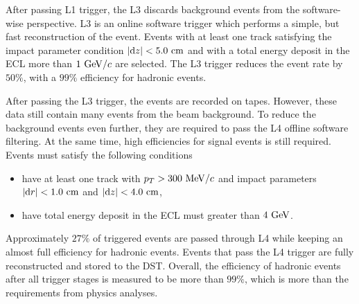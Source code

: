 After passing L1 trigger, the L3 discards background events from the software-wise perspective. L3 is an online software trigger which performs a simple, but fast reconstruction of the event. Events with at least one track satisfying the impact parameter condition $\vert\mathrm{d}z \vert < 5.0\mathrm{~cm}$ and with a total energy deposit in the ECL more than $1\mathrm{~GeV}/c$ are selected. The L3 trigger reduces the event rate by $50\%$, with a $99\%$ efficiency for hadronic events.

After passing the L3 trigger, the events are recorded on tapes. However, these data still contain many events from the beam background. To reduce the background events even further, they are required to pass the L4 offline software filtering. At the same time, high efficiencies for signal events is still required. Events must satisfy the following conditions
\begin{itemize}
	\item have at least one track with $p_T > 300\mathrm{~MeV}/c$ and impact parameters $\vert \mathrm{d}r \vert < 1.0\mathrm{~cm}$ and $\vert \mathrm{d}z \vert < 4.0\mathrm{~cm}$,
	\item have total energy deposit in the ECL must greater than $4\mathrm{~GeV}$.
\end{itemize}
Approximately $27\%$ of triggered events are passed through L4 while keeping an almost full efficiency for hadronic events. Events that pass the L4 trigger are fully reconstructed and stored to the DST. Overall, the efficiency of hadronic events after all trigger stages is measured to be more than $99\%$, which is more than the requirements from physics analyses.



